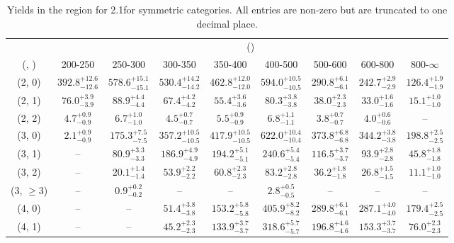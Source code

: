 \begin{table}[h!]
\tiny
\centering
\caption{Yields in the \mj region for 2.1\ifb for symmetric categories. All entries are non-zero but are truncated to one decimal place.\label{tab:yieldsnodata_mu_comb_sym}}
\begin{tabular}
{ccccccccc}
	\hline\hline
	& \multicolumn{8}{c}{\scalht (\gev)} \\ 
	 (\njet,  \nb) & 200-250 & 250-300 & 300-350 & 350-400 & 400-500 & 500-600 & 600-800 & 800-$\infty$ \\ [0.8ex] 
\hline
	(2, 0) & $392.8^{+ 12.6 }_{- 12.6 }$ & $578.6^{+ 15.1 }_{- 15.1 }$ & $530.4^{+ 14.2 }_{- 14.2 }$ & $462.8^{+ 12.0 }_{- 12.0 }$ & $594.0^{+ 10.5 }_{- 10.5 }$ & $290.8^{+ 6.1 }_{- 6.1 }$ & $242.7^{+ 2.9 }_{- 2.9 }$ & $126.4^{+ 1.9 }_{- 1.9 }$ \\[0.5ex] 
	(2, 1) & $76.0^{+ 3.9 }_{- 3.9 }$ & $88.9^{+ 4.4 }_{- 4.4 }$ & $67.4^{+ 4.2 }_{- 4.2 }$ & $55.4^{+ 3.6 }_{- 3.6 }$ & $80.3^{+ 3.8 }_{- 3.8 }$ & $38.0^{+ 2.3 }_{- 2.3 }$ & $33.0^{+ 1.6 }_{- 1.6 }$ & $15.1^{+ 1.0 }_{- 1.0 }$ \\[0.5ex] 
	(2, 2) & $4.7^{+ 0.9 }_{- 0.9 }$ & $6.7^{+ 1.0 }_{- 1.0 }$ & $4.5^{+ 0.7 }_{- 0.7 }$ & $5.5^{+ 0.9 }_{- 0.9 }$ & $6.8^{+ 1.1 }_{- 1.1 }$ & $3.8^{+ 0.7 }_{- 0.7 }$ & $4.0^{+ 0.6 }_{- 0.6 }$ & -- \\[0.5ex] 
	(3, 0) & $2.1^{+ 0.9 }_{- 0.9 }$ & $175.3^{+ 7.5 }_{- 7.5 }$ & $357.2^{+ 10.5 }_{- 10.5 }$ & $417.9^{+ 10.5 }_{- 10.5 }$ & $622.0^{+ 10.4 }_{- 10.4 }$ & $373.8^{+ 6.8 }_{- 6.8 }$ & $344.2^{+ 3.8 }_{- 3.8 }$ & $198.8^{+ 2.5 }_{- 2.5 }$ \\[0.5ex] 
	(3, 1) & -- & $80.9^{+ 3.3 }_{- 3.3 }$ & $186.9^{+ 4.9 }_{- 4.9 }$ & $194.2^{+ 5.1 }_{- 5.1 }$ & $240.6^{+ 5.4 }_{- 5.4 }$ & $116.5^{+ 3.7 }_{- 3.7 }$ & $93.9^{+ 2.8 }_{- 2.8 }$ & $45.8^{+ 1.8 }_{- 1.8 }$ \\[0.5ex] 
	(3, 2) & -- & $20.1^{+ 1.4 }_{- 1.4 }$ & $53.9^{+ 2.2 }_{- 2.2 }$ & $60.8^{+ 2.3 }_{- 2.3 }$ & $83.2^{+ 2.8 }_{- 2.8 }$ & $36.2^{+ 1.8 }_{- 1.8 }$ & $26.8^{+ 1.5 }_{- 1.5 }$ & $11.1^{+ 1.0 }_{- 1.0 }$ \\[0.5ex] 
	(3, $\ge3$) & -- & $0.9^{+ 0.2 }_{- 0.2 }$ & -- & -- & $2.8^{+ 0.5 }_{- 0.5 }$ & -- & -- & -- \\[0.5ex] 
	(4, 0) & -- & -- & $51.4^{+ 3.8 }_{- 3.8 }$ & $153.2^{+ 5.8 }_{- 5.8 }$ & $405.9^{+ 8.2 }_{- 8.2 }$ & $289.8^{+ 6.1 }_{- 6.1 }$ & $287.1^{+ 4.0 }_{- 4.0 }$ & $179.4^{+ 2.5 }_{- 2.5 }$ \\[0.5ex] 
	(4, 1) & -- & -- & $45.2^{+ 2.3 }_{- 2.3 }$ & $133.9^{+ 3.7 }_{- 3.7 }$ & $318.6^{+ 5.7 }_{- 5.7 }$ & $196.8^{+ 4.6 }_{- 4.6 }$ & $153.3^{+ 3.7 }_{- 3.7 }$ & $76.0^{+ 2.3 }_{- 2.3 }$ \\[0.5ex] 

\end{tabular}
\end{table}
